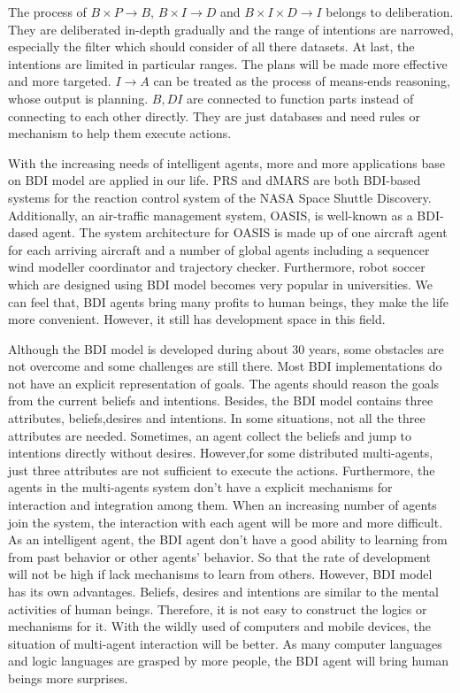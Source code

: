 The process of $B \times P \to B$, $B \times I \to D$ and $B \times I \times D \to I$ belongs to deliberation. They are deliberated in-depth gradually and the range of intentions are narrowed, especially the filter which should consider of all there datasets. At last, the intentions are limited in particular ranges. The plans will be made more effective and more targeted.  $I \to A $ can be treated as the process of means-ends reasoning, whose output is planning. $B,D I$ are connected to function parts instead of connecting to each other directly. They are just databases and need rules or mechanism to help them execute actions.

With the increasing needs of intelligent agents, more and more applications base on BDI model are applied in our life. PRS and dMARS are both BDI-based systems for the reaction control system of the NASA Space Shuttle Discovery. Additionally, an air-traffic management system, OASIS, is well-known as a BDI-dased agent. The system architecture for OASIS is made up of one aircraft agent for each arriving aircraft and a number of global agents including a sequencer wind modeller coordinator and trajectory checker\cite{Rao_BDITheory_1995}. Furthermore, robot soccer which are designed using BDI model becomes very popular in universities. We can feel that, BDI agents bring many profits to human beings, they make the life more convenient. However, it still has development space in this field.

Although the BDI model is developed during about 30 years, some obstacles are not overcome and some challenges are still there. Most BDI implementations do not have an explicit representation of goals. The agents should reason the goals from the current beliefs and intentions. Besides, the BDI model contains three attributes, beliefs,desires and intentions. In some situations, not all the three attributes are needed. Sometimes, an agent collect the beliefs and jump to intentions directly without desires. However,for some distributed multi-agents, just three attributes are not sufficient to execute the actions.  Furthermore, the agents in the multi-agents system don't have a explicit mechanisms for interaction and integration among them. When an increasing number of agents join the system, the interaction with each agent will be more and more difficult. As an intelligent agent, the BDI agent don't have a good ability to learning from from past behavior or other agents’ behavior. So that the rate of development will not be high if lack mechanisms to learn from others. However, BDI model has its own advantages. Beliefs, desires and intentions are similar to the mental activities of human beings. Therefore, it is not easy to construct the logics or mechanisms for it. With the wildly used of computers and mobile devices, the situation of multi-agent interaction will be better. As many computer languages and logic languages are grasped by more people, the BDI agent will bring human beings more surprises.

